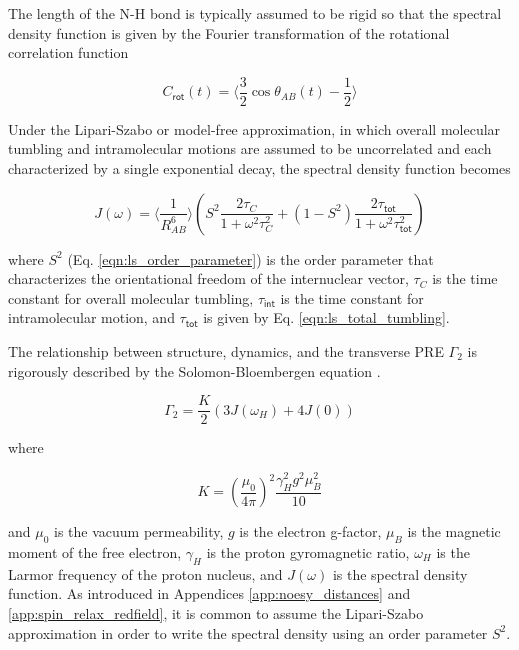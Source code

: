 \documentclass[9pt,review]{livecoms}
\begin{document}
The length of the N-H bond is typically assumed to be rigid so that the spectral density function is given by the Fourier transformation of the rotational correlation function

\begin{equation}
\label{eqn:spin_relaxation_correlation_function}
C_{\mathsf{rot}}(t) = \langle \frac {3} {2} \cos \theta_{AB}(t) - \frac {1} {2} \rangle
\end{equation}

Under the Lipari-Szabo or model-free approximation, in which overall molecular tumbling and intramolecular motions are assumed to be uncorrelated and each characterized by a single exponential decay, the spectral density function becomes

\begin{equation}
\label{eqn:spin_relaxation_spectral_density}
J(\omega) = \langle \frac {1} {R_{AB}^6} \rangle \left( S^2 \frac {2 \tau_C} {1 + \omega^2 \tau_C^2} + \left( 1 - S^2 \right) \frac {2 \tau_{\mathsf{tot}}} {1 + \omega^2 \tau_{\mathsf{tot}}^2} \right)
\end{equation}

\noindent where $S^2$ (Eq. \ref{eqn:ls_order_parameter}) is the order parameter that characterizes the orientational freedom of the internuclear vector, $\tau_C$ is the time constant for overall molecular tumbling, $\tau_{\mathsf{int}}$ is the time constant for intramolecular motion, and $\tau_{\mathsf{tot}}$ is given by Eq. \ref{eqn:ls_total_tumbling}.

\label{app:pre_solomon}

The relationship between structure, dynamics, and the transverse PRE $\Gamma_2$ is rigorously described by the Solomon-Bloembergen equation \cite{solomon_nuclear_1956}.

\begin{equation}
\label{eqn:solomon-bloembergen}
\Gamma_2 = \frac {K} {2} \left( 3 J(\omega_H) + 4 J(0) \right)
\end{equation}

\noindent where

\begin{equation}
\label{eqn:pre_constant}
K = \left( \frac {\mu_0} {4 \pi} \right)^2 \frac {\gamma_H^2 g^2 \mu_B^2} {10}
\end{equation}

\noindent and $\mu_0$ is the vacuum permeability, $g$ is the electron g-factor, $\mu_B$ is the magnetic moment of the free electron, $\gamma_H$ is the proton gyromagnetic ratio, $\omega_H$ is the Larmor frequency of the proton nucleus, and $J(\omega)$ is the spectral density function.
As introduced in Appendices \ref{app:noesy_distances} and \ref{app:spin_relax_redfield}, it is common to assume the Lipari-Szabo approximation in order to write the spectral density using an order parameter $S^2$.
\end{document}

